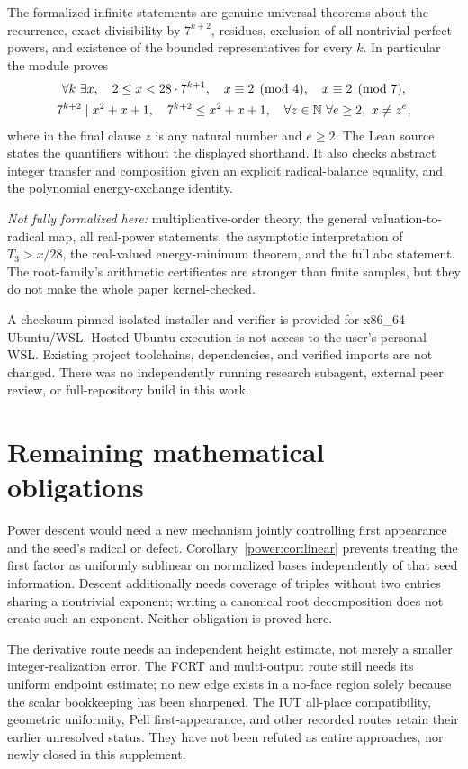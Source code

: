 The formalized infinite statements are genuine universal theorems about
the recurrence, exact divisibility by $7^{k+2}$, residues, exclusion of
all nontrivial perfect powers, and existence of the bounded
representatives for every $k$. In particular the module proves
\begin{gather*}
\forall k\ \exists x,\quad 2\le x<28\cdot7^{k+1},\quad
x\equiv2\pmod4,\quad x\equiv2\pmod7,\\
7^{k+2}\mid x^2+x+1,\quad 7^{k+2}\le x^2+x+1,\quad
\forall z\in\mathbb N\ \forall e\ge2,\ x\ne z^e,
\end{gather*}
where in the final clause $z$ is any natural number and $e\ge2$.
The Lean source states the quantifiers without the displayed shorthand.
It also checks abstract integer transfer and composition given an explicit
radical-balance equality, and the polynomial energy-exchange identity.

\emph{Not fully formalized here:} multiplicative-order theory, the general
valuation-to-radical map, all real-power statements, the asymptotic
interpretation of $T_3>x/28$, the real-valued energy-minimum theorem, and the
full abc statement. The root-family's arithmetic certificates are stronger
than finite samples, but they do not make the whole paper kernel-checked.

A checksum-pinned isolated installer and verifier is provided for x86\_64
Ubuntu/WSL. Hosted Ubuntu execution is not access to the user's personal
WSL. Existing project toolchains, dependencies, and verified imports are
not changed. There was no independently running research subagent,
external peer review, or full-repository build in this work.

\section{Remaining mathematical obligations}
Power descent would need a new mechanism jointly controlling first
appearance and the seed's radical or defect. Corollary~\ref{power:cor:linear}
prevents treating the first factor as uniformly sublinear on normalized
bases independently of that seed information. Descent additionally needs
coverage of triples without two entries sharing a nontrivial exponent;
writing a canonical root decomposition does not create such an exponent.
Neither obligation is proved here.

The derivative route needs an independent height estimate, not merely a
smaller integer-realization error. The FCRT and multi-output route still
needs its uniform endpoint estimate; no new edge exists in a no-face region
solely because the scalar bookkeeping has been sharpened. The IUT
all-place compatibility, geometric uniformity, Pell first-appearance, and
other recorded routes retain their earlier unresolved status. They have
not been refuted as entire approaches, nor newly closed in this supplement.

